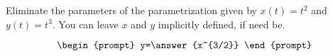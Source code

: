 \documentclass{ximera}
\author{Gregory Hartman \and Matthew Carr}
\begin{document}
\begin{exercise}



Eliminate the parameters of the parametrization given by $x(t)=t^2$ and $y(t)=t^3$. You can leave $x$ and $y$ implicitly defined, if need be.

\[
\begin{prompt}
y=\answer{x^{3/2}}
\end{prompt}
\]

\end{exercise}
\end{document}
